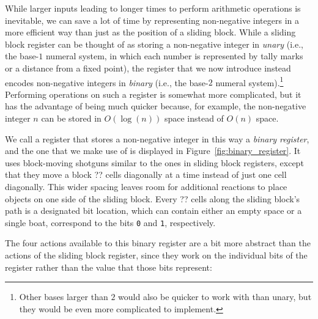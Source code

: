 While larger inputs leading to longer times to perform arithmetic operations is inevitable, we can save a lot of time by representing non-negative integers in a more efficient way than just as the position of a sliding block. While a sliding block register can be thought of as storing a non-negative integer in \emph{unary} (i.e., the base-$1$ numeral system, in which each number is represented by tally marks or a distance from a fixed point), the register that we now introduce instead encodes non-negative integers in \emph{binary} (i.e., the base-$2$ numeral system).\footnote{Other bases larger than $2$ would also be quicker to work with than unary, but they would be even more complicated to implement.} Performing operations on such a register is somewhat more complicated, but it has the advantage of being much quicker because, for example, the non-negative integer $n$ can be stored in $O(\log(n))$ space instead of $O(n)$ space.

We call a register that stores a non-negative integer in this way a \emph{binary register}, and the one that we make use of is displayed in Figure~\ref{fig:binary_register}. It uses block-moving shotguns similar to the ones in sliding block registers, except that they move a block ?? cells diagonally at a time instead of just one cell diagonally. This wider spacing leaves room for additional reactions to place objects on one side of the sliding block. Every ?? cells along the sliding block's path is a designated bit location, which can contain either an empty space or a single boat, correspond to the bits \texttt{0} and \texttt{1}, respectively.



The four actions available to this binary register are a bit more abstract than the actions of the sliding block register, since they work on the individual bits of the register rather than the value that those bits represent:\smallskip

